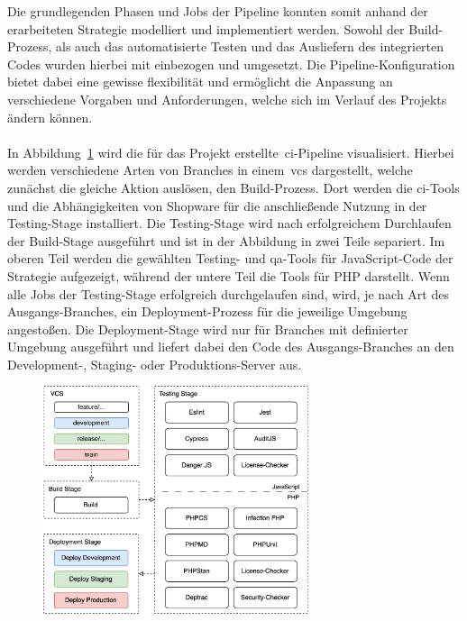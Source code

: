 Die grundlegenden Phasen und Jobs der Pipeline konnten somit anhand der erarbeiteten Strategie modelliert und
implementiert werden.
Sowohl der Build-Prozess, als auch das automatisierte Testen und das Ausliefern des integrierten Codes wurden hierbei
mit einbezogen und umgesetzt.
Die Pipeline-Konfiguration bietet dabei eine gewisse flexibilität und ermöglicht die Anpassung an verschiedene
Vorgaben und Anforderungen, welche sich im Verlauf des Projekts ändern können.
\\\\
In Abbildung\ \ref{fig:ci-pipeline-concept} wird die für das Projekt erstellte\ \acrshort{ci}-Pipeline visualisiert.
Hierbei werden verschiedene Arten von Branches in einem\ \acrshort{vcs} dargestellt, welche zunächst die gleiche Aktion
auslösen, den Build-Prozess.
Dort werden die \acrshort{ci}-Tools und die Abhängigkeiten von Shopware für die anschließende Nutzung in der
Testing-Stage installiert.
Die Testing-Stage wird nach erfolgreichem Durchlaufen der Build-Stage ausgeführt und ist in der Abbildung in zwei
Teile separiert.
Im oberen Teil werden die gewählten Testing- und \acrshort{qa}-Tools für JavaScript-Code der Strategie aufgezeigt,
während der untere Teil die Tools für PHP darstellt.
Wenn alle Jobs der Testing-Stage erfolgreich durchgelaufen sind, wird, je nach Art des Ausgangs-Branches, ein
Deployment-Prozess für die jeweilige Umgebung angestoßen.
Die Deployment-Stage wird nur für Branches mit definierter Umgebung ausgeführt und liefert dabei den Code des
Ausgangs-Branches an den Development-, Staging- oder Produktions-Server aus.

\begin{figure}[H]
    \centering
    \includegraphics[width=0.69420\textwidth]{images/content/ci-pipeline-concept}
    \label{fig:ci-pipeline-concept}
\end{figure}

